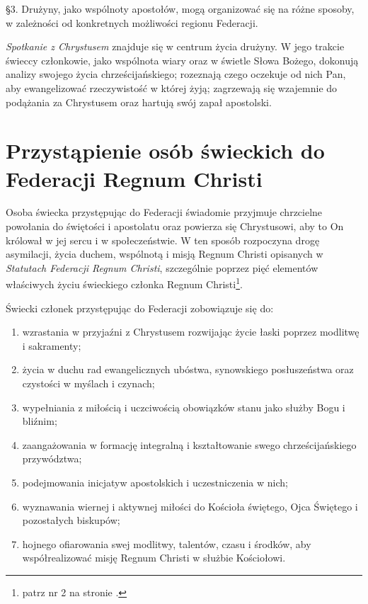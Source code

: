 \S{}3. Drużyny, jako wspólnoty apostołów, mogą organizować się na różne sposoby, w zależności od konkretnych możliwości regionu Federacji.


 {\em Spotkanie z Chrystusem} znajduje się w centrum życia drużyny. W jego trakcie świeccy członkowie, jako wspólnota wiary oraz w świetle Słowa Bożego, dokonują analizy swojego życia chrześcijańskiego; rozeznają czego oczekuje od nich Pan, aby ewangelizować rzeczywistość w której żyją; zagrzewają się wzajemnie do podążania za Chrystusem oraz hartują swój zapał apostolski.

\chapter{Przystąpienie osób świeckich do Federacji Regnum Christi}


 Osoba świecka przystępując do Federacji świadomie przyjmuje chrzcielne powołania do świętości i apostolatu oraz powierza się Chrystusowi, aby to On królował w jej sercu i w społeczeństwie. W ten sposób rozpoczyna drogę asymilacji, życia duchem, wspólnotą i misją Regnum Christi opisanych w {\em Statutach Federacji Regnum Christi}, szczególnie poprzez pięć elementów właściwych życiu świeckiego członka Regnum Christi\footnote{patrz nr 2 na stronie \pageref{numerdwa}.}.


 Świecki członek przystępując do Federacji zobowiązuje się do:
\begin{enumerate}
	
	\item wzrastania w przyjaźni z Chrystusem rozwijając życie łaski poprzez modlitwę i sakramenty;
	
	\item życia w duchu rad ewangelicznych ubóstwa, synowskiego posłuszeństwa oraz czystości w myślach i czynach;
	
	\item wypełniania z miłością i uczciwością obowiązków stanu jako służby Bogu i bliźnim;
	
	\item zaangażowania w formację integralną i kształtowanie swego chrześcijańskiego przywództwa;
	
	\item podejmowania inicjatyw apostolskich i uczestniczenia w nich;
	
	\item wyznawania wiernej i aktywnej miłości do Kościoła świętego, Ojca Świętego i pozostałych biskupów;
	
	\item hojnego ofiarowania swej modlitwy, talentów, czasu i środków, aby współrealizować misję Regnum Christi w służbie Kościołowi.
\end{enumerate}

